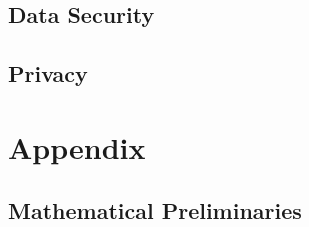 \documentclass{book}
\begin{document}
  \chapter{Data Security}
    


  \chapter{Privacy}

%
%  

\part{Appendix}

\appendix

\chapter{Mathematical Preliminaries}\label{sec:math}




\end{document}
